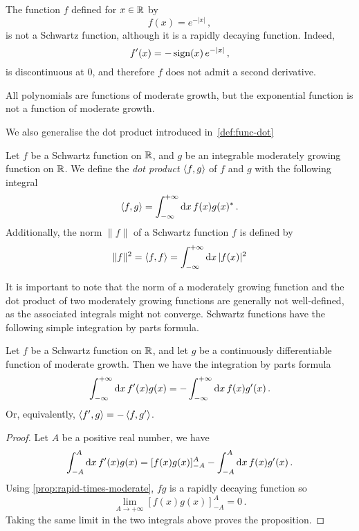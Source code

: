 \begin{example}
  The function $f$ defined for $x\in\mathbb{R}$ by
  \begin{equation}
    f(x)=e^{-|x|}\,,
  \end{equation}
  is not a Schwartz function, although it is a rapidly decaying function. Indeed,
  \begin{equation}
    f'(x)=-\operatorname{sign}(x)\,e^{-|x|}\,,
  \end{equation}
  is discontinuous at $0$, and therefore $f$ does not admit a second derivative.
\end{example}
\begin{example}
  All polynomials are functions of moderate growth, but the exponential function is not a
  function of moderate growth.
\end{example}
We also generalise the dot product introduced in~\cref{def:func-dot}
\begin{definition}
  Let $f$ be a Schwartz function on $\mathbb{R}$, and $g$ be an integrable moderately growing
  function on $\mathbb{R}$. We define the \emph{dot product} $\braket{f,g}$ of $f$ and $g$ with
  the following integral
  \begin{equation}
    \braket{f,g}=\int_{-\infty}^{+\infty}\mathrm{d}{x}\,f(x)g(x)^*\,.
  \end{equation}
  Additionally, the norm $\|f\|$ of a Schwartz function $f$ is defined by
  \begin{equation}
    \|f\|^2=\braket{f,f}=\int_{-\infty}^{+\infty}\mathrm{d}{x}\,|f(x)|^2
  \end{equation}
\end{definition}
It is important to note that the norm of a moderately growing function and the dot product
of two moderately growing functions are generally not well-defined, as the associated
integrals might not converge. Schwartz functions have the following simple integration by
parts formula.
\begin{proposition}
  Let $f$ be a Schwartz function on $\mathbb{R}$, and let $g$ be a continuously differentiable
  function of moderate growth. Then we have the integration by parts formula
  \begin{equation}
    \int_{-\infty}^{+\infty}\mathrm{d}{x}\,f'(x)g(x)=-\int_{-\infty}^{+\infty}\mathrm{d}{x}\,f(x)g'(x)\,.
  \end{equation}
  Or, equivalently, $\braket{f',g}=-\braket{f,g'}$.
\end{proposition}
\begin{proof}
  Let $A$ be a positive real number, we have
  \begin{equation}
    \int_{-A}^A\mathrm{d} x\,f'(x)g(x)=[f(x)g(x)]_{-A}^A-\int_{-A}^A\mathrm{d} x\,f(x)g'(x)\,.
  \end{equation}
  Using \cref{prop:rapid-times-moderate}, $fg$ is a rapidly decaying function so
  \begin{equation}
    \lim_{A\to+\infty}[f(x)g(x)]_{-A}^A=0\,.
  \end{equation}
  Taking the same limit in the two integrals above proves the proposition.
\end{proof}

